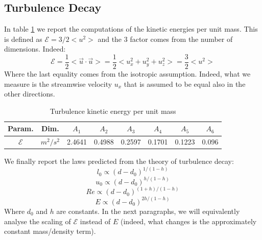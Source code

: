 \documentclass[11pt,titlepage]{article}
\begin{document}
\subsection{Turbulence Decay} \label{turbulence_decay}
In table \ref{tab5} we report the computations of the kinetic energies per unit mass. This is defined as $\mathcal{E} = 3/2<u^2>$ and the $3$ factor comes from the number of dimensions. Indeed: 
\begin{equation*}
	\mathcal{E} = \frac{1}{2} < \vec{u} \cdot \vec{u} >= \frac{1}{2} < u_x^2 + u_y^2 + u_z^2 > = \frac{3}{2} <u^2>
\end{equation*}
Where the last equality comes from the isotropic assumption. Indeed, what we measure is the streamwise velocity $u_x$ that is assumed to be equal also in the other directions.
\begin{table}[h!]
\centering
\caption{Turbulence kinetic energy per unit mass} \label{tab5}
    \begin{tabular}{ | c | c | c | c | c | c | c | c |}
        \hline
        Param. & Dim. & $A_1$ & $A_2$ & $A_3$ & $A_4$ & $A_5$ & $A_6$ \\
        \hline
        $\mathcal{E}$&$m^2/s^2$ &2.4641& 0.4988& 0.2597& 0.1701 & 0.1223 &0.096  \\
        \hline
    \end{tabular}
\end{table}

We finally report the laws predicted from the theory of turbulence decay:
\begin{equation} \label{l_0_decay}
	l_0 \propto (d-d_0)^{1/(1-h)}
\end{equation}
\begin{equation}\label{u_0_decay}
	u_0 \propto (d-d_0)^{h/(1-h)}
\end{equation}
\begin{equation}\label{Re_decay}
	Re \propto (d-d_0)^{(1+h)/(1-h)}
\end{equation}
\begin{equation}\label{E_decay}
	E \propto (d-d_0)^{2h/(1-h)}
\end{equation}
Where $d_0$ and $h$ are constants. In the next paragraphs, we will equivalently analyse the scaling of $\mathcal{E}$ instead of $E$ (indeed, what changes is the approximately constant mass/density term).
\end{document}
